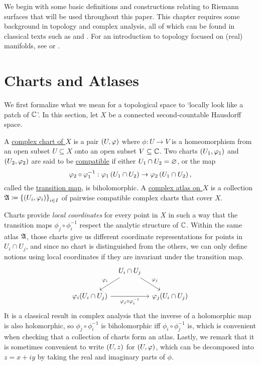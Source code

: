 \documentclass[../Moduli_Spaces_of_Riemann_Surfaces.tex]{subfiles}
\begin{document}
    We begin with some basic definitions and constructions relating to Riemann surfaces that will be used throughout this paper. This chapter requires some background in topology and complex analysis, all of which can be found in classical texts such as \cite{munkres} and \cite{lang}. For an introduction to topology focused on (real) manifolds, see \cite{leeTM} or \cite{tu}.
    \section{Charts and Atlases}\label{RS:sec:charts_and_atlases}
    We first formalize what we mean for a topological space to `locally look like a patch of $\C$'. In this section, let $X$ be a connected second-countable Hausdorff space.
    \begin{definition}
        A \ul{complex chart of $X$} is a pair $\tpl{U,\phi}$ where $\phi:U\to V$ is a homeomorphism from an open subset $U\subseteq X$ onto an open subset $V\subseteq\C$. Two charts $\l(U_1,\phi_1\r)$ and $\l(U_2,\phi_2\r)$ are said to be \ul{compatible} if either $U_1\cap U_2=\em$, or the map
        \begin{equation*}
            \phi_2\circ\phi_1^{-1}:\phi_1\l(U_1\cap U_2\r)\to\phi_2\l(U_1\cap U_2\r),
        \end{equation*}
        called the \ul{transition map}, is biholomorphic. A \ul{complex atlas on $X$} is a collection $\mf{A}\coloneqq\l\{\l(U_i,\phi_i\r)\r\}_{i\in I}$ of pairwise compatible complex charts that cover $X$.
    \end{definition}
    \begin{remark}
        Charts provide \textit{local coordinates} for every point in $X$ in such a way that the transition maps $\phi_j\circ\phi_i^{-1}$ respect the analytic structure of $\C$. Within the same atlas $\mf{A}$, those charts give us different coordinate representations for points in $U_i\cap U_j$, and since no chart is distinguished from the others, we can only define notions using local coordinates if they are invariant under the transition map.
        \begin{equation*}
            \begin{tikzcd}[column sep=0.1in]
                & U_i\cap U_j \ar[dl, "\phi_i"'] \ar[dr, "\phi_j"] \\
                \phi_i(U_i\cap U_j) \ar[rr, "\phi_j\circ\phi_i^{-1}"'] & & \phi_j(U_i\cap U_j)
            \end{tikzcd}
        \end{equation*}
        It is a classical result in complex analysis that the inverse of a holomorphic map is also holomorphic, so $\phi_j\circ\phi_i^{-1}$ is biholomorphic iff $\phi_i\circ\phi_j^{-1}$ is, which is convenient when checking that a collection of charts form an atlas. Lastly, we remark that it is sometimes convenient to write $\tpl{U,z}$ for $\tpl{U,\phi}$, which can be decomposed into $z=x+iy$ by taking the real and imaginary parts of $\phi$.\exqed
    \end{remark}
\end{document}

